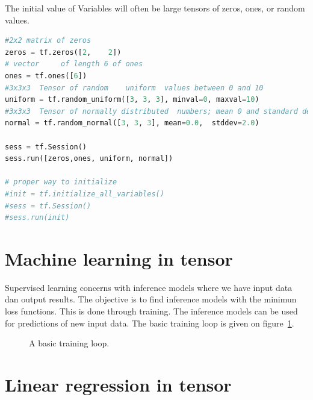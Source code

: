 \documentclass[vecarrow]{svproc}
\begin{document}
The	initial value of Variables will often be large tensors of zeros, ones,	or random
values.

\begin{lstlisting}[language=Python,
caption={use placeholders in tensor},label={list7}]
#2x2 matrix	of zeros
zeros = tf.zeros([2,	2])
# vector	 of length 6 of ones
ones = tf.ones([6])
#3x3x3	Tensor of random	uniform	 values between 0 and 10
uniform = tf.random_uniform([3, 3, 3], minval=0, maxval=10)
#3x3x3	Tensor of normally distributed	numbers; mean 0 and standard deviation 2
normal = tf.random_normal([3, 3, 3], mean=0.0,	stddev=2.0)

sess = tf.Session()
sess.run([zeros,ones, uniform, normal])

# proper way to initialize
#init = tf.initialize_all_variables()
#sess = tf.Session()
#sess.run(init)
\end{lstlisting}

\section{Machine learning in tensor}

Supervised learning concerns with inference models where we have input data dan output results. The objective is to find inference models with the minimun loss functions. This is done through training. The inference models can be used for predictions of new input data. The basic training loop is given on figure~\ref{fig:6}.

\begin{figure}
\caption{A basic training loop.}
\label{fig:6}
\end{figure}

\section{Linear regression in tensor}
\end{document}
